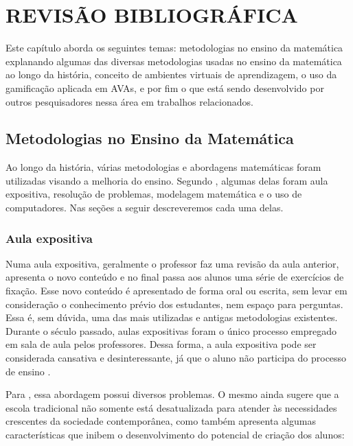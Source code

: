 \section{REVISÃO BIBLIOGRÁFICA}

Este capítulo aborda os seguintes temas: metodologias no ensino da matemática explanando algumas das diversas metodologias usadas no ensino da matemática ao longo da história, conceito de ambientes virtuais de aprendizagem, o uso da gamificação aplicada em AVAs, e por fim o que está sendo desenvolvido por outros pesquisadores nessa área em trabalhos relacionados.

\subsection{Metodologias no Ensino da Matemática}

Ao longo da história, várias metodologias e abordagens matemáticas foram utilizadas visando a melhoria do ensino. Segundo , algumas delas foram aula expositiva, resolução de problemas, modelagem matemática e o uso de computadores. Nas seções a seguir descreveremos cada uma delas.

\subsubsection{Aula expositiva}

Numa aula expositiva, geralmente o professor faz uma revisão da aula anterior, apresenta o novo conteúdo e no final passa aos alunos uma série de exercícios de fixação. Esse novo conteúdo é apresentado de forma oral ou escrita, sem levar em consideração o conhecimento prévio dos estudantes, nem espaço para perguntas. Essa é, sem dúvida, uma das mais utilizadas e antigas metodologias existentes. Durante o século passado, aulas expositivas foram o único processo empregado em sala de aula pelos professores. Dessa forma, a aula expositiva pode ser considerada cansativa e desinteressante, já que o aluno não participa do processo de ensino  \cite{hammes2003tendencias}.

Para , essa abordagem possui diversos problemas. O mesmo ainda sugere que a escola tradicional não somente está desatualizada para atender às necessidades crescentes da sociedade contemporânea, como também apresenta algumas características que inibem o desenvolvimento do potencial de criação dos alunos: 

